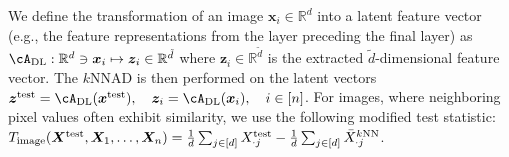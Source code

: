 We define the transformation of an image $\bm x_i \in \mathbb{R}^d$ into a latent feature vector (e.g., the feature representations from the layer preceding the final layer) as $\cA_{\rm DL}: \mathbb{R}^d \ni \bm x_i \mapsto \bm z_i \in \mathbb{R}^{\tilde{d}}$ where $\bm z_i \in \mathbb{R}^{\tilde{d}}$ is the extracted $\tilde{d}$-dimensional feature vector.  
%
The $k$NNAD is then performed on the latent vectors $\bm z^{\rm test} = \cA_{\rm DL}(\bm x^{\rm test}), \quad \bm z_i = \cA_{\rm DL}(\bm x_i), \quad i \in [n]$.
%
For images, where neighboring pixel values often exhibit similarity, we use the following modified test statistic:  
$T_{\rm image}(\bm X^{\rm test}, \bm X_1, \ldots, \bm X_n) = \frac{1}{d} \sum_{j \in [d]} X^{\rm test}_{\cdot j} - \frac{1}{d} \sum_{j \in [d]} \bar{X}^{\text{$k$NN}}_{\cdot j}$.

